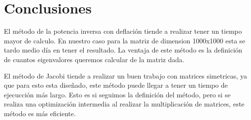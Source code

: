 \section{Conclusiones}

El método de la potencia inversa con deflación tiende a realizar tener un tiempo mayor de calculo. En nuestro caso para la matriz de dimension 1000x1000 esta se tardo medio día en tener el resultado. La ventaja de este método es la definición de cuantos eigenvalores queremos calcular de la matriz dada.

El método de Jacobi tiende a realizar un buen trabajo con matrices simetricas, ya que para esto esta diseñado, este método puede llegar a tener un tiempo de ejecucción más largo. Esto es si seguimos la definición del método, pero si se realiza una optimización intermedia al realizar la multiplicación de matrices, este método es más eficiente.